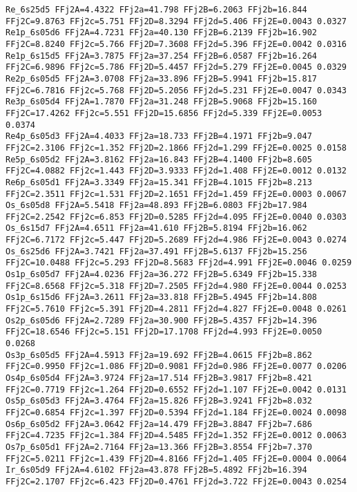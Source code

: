 {\begin{verbatim}
Re_6s25d5 FFj2A=4.4322 FFj2a=41.798 FFj2B=6.2063 FFj2b=16.844 FFj2C=9.8763 FFj2c=5.751 FFj2D=8.3294 FFj2d=5.406 FFj2E=0.0043 0.0327 
Re1p_6s05d6 FFj2A=4.7231 FFj2a=40.130 FFj2B=6.2139 FFj2b=16.902 FFj2C=8.8240 FFj2c=5.766 FFj2D=7.3608 FFj2d=5.396 FFj2E=0.0042 0.0316 
Re1p_6s15d5 FFj2A=3.7875 FFj2a=37.254 FFj2B=6.0587 FFj2b=16.264 FFj2C=6.9896 FFj2c=5.786 FFj2D=5.4457 FFj2d=5.279 FFj2E=0.0045 0.0329 
Re2p_6s05d5 FFj2A=3.0708 FFj2a=33.896 FFj2B=5.9941 FFj2b=15.817 FFj2C=6.7816 FFj2c=5.768 FFj2D=5.2056 FFj2d=5.231 FFj2E=0.0047 0.0343 
Re3p_6s05d4 FFj2A=1.7870 FFj2a=31.248 FFj2B=5.9068 FFj2b=15.160 FFj2C=17.4262 FFj2c=5.551 FFj2D=15.6856 FFj2d=5.339 FFj2E=0.0053 0.0374 
Re4p_6s05d3 FFj2A=4.4033 FFj2a=18.733 FFj2B=4.1971 FFj2b=9.047 FFj2C=2.3106 FFj2c=1.352 FFj2D=2.1866 FFj2d=1.299 FFj2E=0.0025 0.0158 
Re5p_6s05d2 FFj2A=3.8162 FFj2a=16.843 FFj2B=4.1400 FFj2b=8.605 FFj2C=4.0882 FFj2c=1.443 FFj2D=3.9333 FFj2d=1.408 FFj2E=0.0012 0.0132 
Re6p_6s05d1 FFj2A=3.3349 FFj2a=15.341 FFj2B=4.1015 FFj2b=8.213 FFj2C=2.3511 FFj2c=1.531 FFj2D=2.1651 FFj2d=1.459 FFj2E=0.0003 0.0067 
Os_6s05d8 FFj2A=5.5418 FFj2a=48.893 FFj2B=6.0803 FFj2b=17.984 FFj2C=2.2542 FFj2c=6.853 FFj2D=0.5285 FFj2d=4.095 FFj2E=0.0040 0.0303 
Os_6s15d7 FFj2A=4.6511 FFj2a=41.610 FFj2B=5.8194 FFj2b=16.062 FFj2C=6.7172 FFj2c=5.447 FFj2D=5.2689 FFj2d=4.986 FFj2E=0.0043 0.0274 
Os_6s25d6 FFj2A=3.7421 FFj2a=37.491 FFj2B=5.6137 FFj2b=15.256 FFj2C=10.0488 FFj2c=5.293 FFj2D=8.5683 FFj2d=4.991 FFj2E=0.0046 0.0259 
Os1p_6s05d7 FFj2A=4.0236 FFj2a=36.272 FFj2B=5.6349 FFj2b=15.338 FFj2C=8.6568 FFj2c=5.318 FFj2D=7.2505 FFj2d=4.980 FFj2E=0.0044 0.0253 
Os1p_6s15d6 FFj2A=3.2611 FFj2a=33.818 FFj2B=5.4945 FFj2b=14.808 FFj2C=5.7610 FFj2c=5.391 FFj2D=4.2811 FFj2d=4.827 FFj2E=0.0048 0.0261 
Os2p_6s05d6 FFj2A=2.7289 FFj2a=30.900 FFj2B=5.4357 FFj2b=14.396 FFj2C=18.6546 FFj2c=5.151 FFj2D=17.1708 FFj2d=4.993 FFj2E=0.0050 0.0268 
Os3p_6s05d5 FFj2A=4.5913 FFj2a=19.692 FFj2B=4.0615 FFj2b=8.862 FFj2C=0.9950 FFj2c=1.086 FFj2D=0.9081 FFj2d=0.986 FFj2E=0.0077 0.0206 
Os4p_6s05d4 FFj2A=3.9724 FFj2a=17.514 FFj2B=3.9817 FFj2b=8.421 FFj2C=0.7719 FFj2c=1.264 FFj2D=0.6552 FFj2d=1.107 FFj2E=0.0042 0.0131 
Os5p_6s05d3 FFj2A=3.4764 FFj2a=15.826 FFj2B=3.9241 FFj2b=8.032 FFj2C=0.6854 FFj2c=1.397 FFj2D=0.5394 FFj2d=1.184 FFj2E=0.0024 0.0098 
Os6p_6s05d2 FFj2A=3.0642 FFj2a=14.479 FFj2B=3.8847 FFj2b=7.686 FFj2C=4.7235 FFj2c=1.384 FFj2D=4.5485 FFj2d=1.352 FFj2E=0.0012 0.0063 
Os7p_6s05d1 FFj2A=2.7164 FFj2a=13.366 FFj2B=3.8554 FFj2b=7.370 FFj2C=5.0211 FFj2c=1.439 FFj2D=4.8166 FFj2d=1.405 FFj2E=0.0004 0.0064 
Ir_6s05d9 FFj2A=4.6102 FFj2a=43.878 FFj2B=5.4892 FFj2b=16.394 FFj2C=2.1707 FFj2c=6.423 FFj2D=0.4761 FFj2d=3.722 FFj2E=0.0043 0.0254 

\end{verbatim}}
